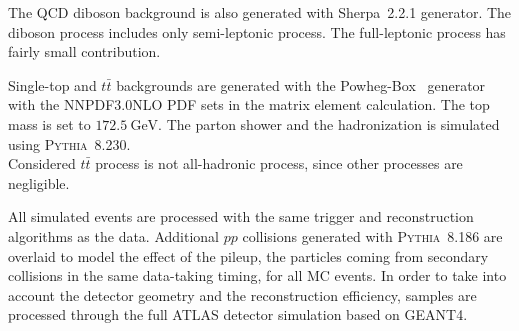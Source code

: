 The QCD diboson background is also generated with Sherpa~2.2.1 generator. 
The diboson process includes only semi-leptonic process. The full-leptonic process has fairly small contribution.

Single-top and $t\bar{t}$ backgrounds are generated with the Powheg-Box~\cite{Alioli:2010xd} generator with the NNPDF3.0NLO PDF\cite{Ball:2014uwa} sets in the matrix element calculation. The top mass is set to $172.5~\mathrm{GeV}$. The parton shower and the hadronization is simulated using \textsc{Pythia}~8.230. \\
Considered $t\bar{t}$ process is not all-hadronic process, since other processes are negligible.

All simulated events are processed with the same trigger and reconstruction algorithms as the data.
Additional $pp$ collisions generated with \textsc{Pythia}~8.186\cite{Sjostrand:2008vc} are overlaid to model the effect of the pileup, the particles coming from secondary collisions in the same data-taking timing, for all MC events.
In order to take into account the detector geometry and the reconstruction efficiency, samples are processed through the full ATLAS detector simulation\cite{SOFT-2010-01} based on \textsc{GEANT4}\cite{Agostinelli:2002hh}.

